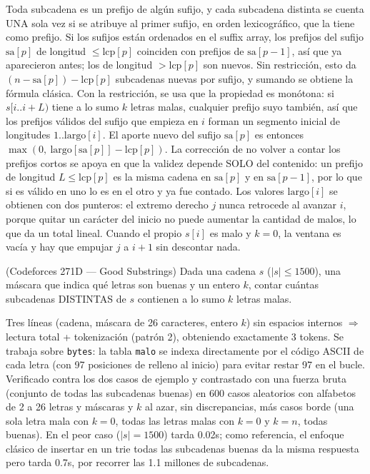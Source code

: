  Toda subcadena es un prefijo de algún sufijo, y cada subcadena distinta se cuenta UNA sola vez si se atribuye al primer sufijo, en orden lexicográfico, que la tiene como prefijo. Si los sufijos están ordenados en el suffix array, los prefijos del sufijo $\text{sa}[p]$ de longitud $\le \text{lcp}[p]$ coinciden con prefijos de $\text{sa}[p-1]$, así que ya aparecieron antes; los de longitud $> \text{lcp}[p]$ son nuevos. Sin restricción, esto da $(n - \text{sa}[p]) - \text{lcp}[p]$ subcadenas nuevas por sufijo, y sumando se obtiene la fórmula clásica. Con la restricción, se usa que la propiedad es monótona: si $s[i..i+L)$ tiene a lo sumo $k$ letras malas, cualquier prefijo suyo también, así que los prefijos válidos del sufijo que empieza en $i$ forman un segmento inicial de longitudes $1..\text{largo}[i]$. El aporte nuevo del sufijo $\text{sa}[p]$ es entonces $\max(0,\ \text{largo}[\text{sa}[p]] - \text{lcp}[p])$. La corrección de no volver a contar los prefijos cortos se apoya en que la validez depende SOLO del contenido: un prefijo de longitud $L \le \text{lcp}[p]$ es la misma cadena en $\text{sa}[p]$ y en $\text{sa}[p-1]$, por lo que si es válido en uno lo es en el otro y ya fue contado. Los valores $\text{largo}[i]$ se obtienen con dos punteros: el extremo derecho $j$ nunca retrocede al avanzar $i$, porque quitar un carácter del inicio no puede aumentar la cantidad de malos, lo que da un total lineal. Cuando el propio $s[i]$ es malo y $k = 0$, la ventana es vacía y hay que empujar $j$ a $i+1$ sin descontar nada.~\cite{manber1993,kasai2001}


(Codeforces 271D — Good Substrings) Dada una cadena $s$ ($|s| \le 1500$), una máscara que indica qué letras son buenas y un entero $k$, contar cuántas subcadenas DISTINTAS de $s$ contienen a lo sumo $k$ letras malas.

 Tres líneas (cadena, máscara de 26 caracteres, entero $k$) sin espacios internos $\Rightarrow$ lectura total + tokenización (patrón 2), obteniendo exactamente 3 tokens. Se trabaja sobre \texttt{bytes}: la tabla \texttt{malo} se indexa directamente por el código ASCII de cada letra (con 97 posiciones de relleno al inicio) para evitar restar 97 en el bucle. Verificado contra los dos casos de ejemplo y contrastado con una fuerza bruta (conjunto de todas las subcadenas buenas) en 600 casos aleatorios con alfabetos de 2 a 26 letras y máscaras y $k$ al azar, sin discrepancias, más casos borde (una sola letra mala con $k=0$, todas las letras malas con $k=0$ y $k=n$, todas buenas). En el peor caso ($|s| = 1500$) tarda \aprox{}0.02s; como referencia, el enfoque clásico de insertar en un trie todas las subcadenas buenas da la misma respuesta pero tarda \aprox{}0.7s, por recorrer las \aprox{}1.1 millones de subcadenas.

